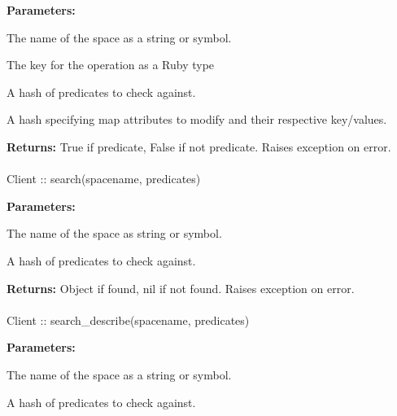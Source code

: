 \noindent\textbf{Parameters:}
\begin{description}[labelindent=\widthof{{\code{mapattributes}}},leftmargin=*,noitemsep,nolistsep,align=right]
\item[\code{spacename}] The name of the space as a string or symbol.
\item[\code{key}] The key for the operation as a Ruby type
\item[\code{predicates}] A hash of predicates to check against.
\item[\code{mapattributes}] A hash specifying map attributes to modify and their respective key/values.
\end{description}

\noindent\textbf{Returns:}
True if predicate, False if not predicate.  Raises exception on error.

\paragraph{}
\label{api:ruby:search}
\begin{rubycode}
Client :: search(spacename, predicates)
\end{rubycode}


\noindent\textbf{Parameters:}
\begin{description}[labelindent=\widthof{{\code{predicates}}},leftmargin=*,noitemsep,nolistsep,align=right]
\item[\code{spacename}] The name of the space as string or symbol.
\item[\code{predicates}] A hash of predicates to check against.
\end{description}

\noindent\textbf{Returns:}
Object if found, nil if not found.  Raises exception on error.

\paragraph{}
\label{api:ruby:search_describe}
\begin{rubycode}
Client :: search_describe(spacename, predicates)
\end{rubycode}


\noindent\textbf{Parameters:}
\begin{description}[labelindent=\widthof{{\code{predicates}}},leftmargin=*,noitemsep,nolistsep,align=right]
\item[\code{spacename}] The name of the space as a string or symbol.
\item[\code{predicates}] A hash of predicates to check against.
\end{description}

